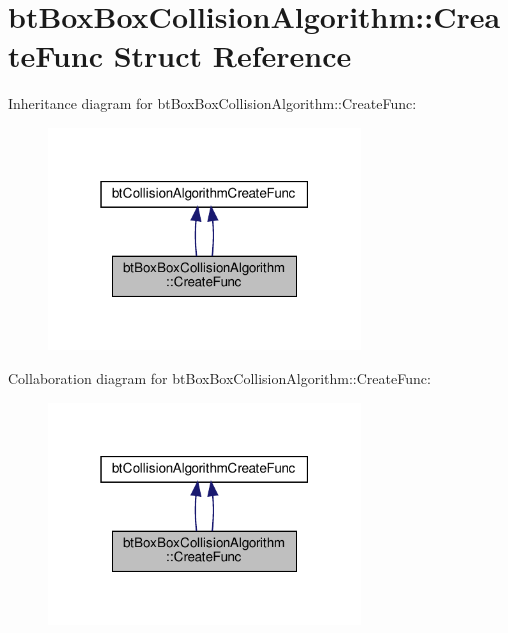 \hypertarget{structbtBoxBoxCollisionAlgorithm_1_1CreateFunc}{}\section{bt\+Box\+Box\+Collision\+Algorithm\+:\+:Create\+Func Struct Reference}
\label{structbtBoxBoxCollisionAlgorithm_1_1CreateFunc}


Inheritance diagram for bt\+Box\+Box\+Collision\+Algorithm\+:\+:Create\+Func\+:
\nopagebreak
\begin{figure}[H]
\begin{center}
\leavevmode
\includegraphics[width=235pt]{structbtBoxBoxCollisionAlgorithm_1_1CreateFunc__inherit__graph}
\end{center}
\end{figure}


Collaboration diagram for bt\+Box\+Box\+Collision\+Algorithm\+:\+:Create\+Func\+:
\nopagebreak
\begin{figure}[H]
\begin{center}
\leavevmode
\includegraphics[width=235pt]{structbtBoxBoxCollisionAlgorithm_1_1CreateFunc__coll__graph}
\end{center}
\end{figure}
